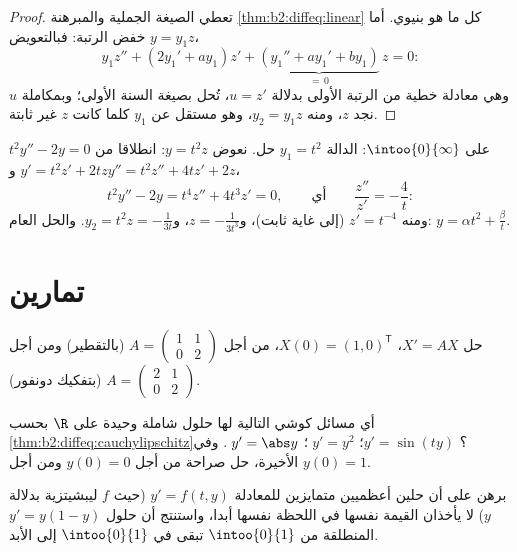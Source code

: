 \begin{proof}
تعطي الصيغة الجملية والمبرهنة \cref{thm:b2:diffeq:linear} كل ما هو بنيوي. أما خفض الرتبة:
فبالتعويض $y = y_1z$،
\[
y_1 z'' + (2y_1' + a y_1)z' + \underbrace{(y_1'' + ay_1' +
by_1)}_{=\,0}\,z = 0 :
\]
وهي معادلة خطية من الرتبة الأولى بدلالة $u = z'$، تُحل بصيغة السنة
الأولى؛ وبمكاملة $u$ نجد $z$، ومنه $y_2 = y_1 z$، وهو مستقل عن $y_1$
كلما كانت $z$ غير ثابتة.
\end{proof}

\begin{example}\label{ex:b2:diffeq:lowering}
$t^2y'' - 2y = 0$ على $\intoo{0}{\infty}$: الدالة $y_1 = t^2$ حل. نعوض $y = t^2z$: انطلاقا من $y' = t^2z' + 2tz$
و$y''
= t^2z'' + 4tz' + 2z$،
\[
t^2y'' - 2y = t^4 z'' + 4t^3z' = 0,
\qquad\text{أي}\qquad \frac{z''}{z'} = -\frac4t :
\]
ومنه $z' = t^{-4}$ (إلى غاية ثابت)، و$z = -\frac{1}{3t^3}$، و$y_2
= t^2z = -\frac{1}{3t}$. والحل العام: $y = \alpha t^2 +
\frac{\beta}{t}$.
\end{example}

\section{تمارين}

\begin{exercise}[$\star$]\label{exo:b2:diffeq:1}
حل $X' = AX$، $X(0) = (1, 0)^{\mathsf T}$، من أجل $A =
\begin{pmatrix} 1 & 1\\ 0 & 2\end{pmatrix}$ (بالتقطير) ومن أجل $A =
\begin{pmatrix} 2 & 1\\ 0 & 2 \end{pmatrix}$
(بتفكيك دونفور).
\end{exercise}

\begin{exercise}[$\star$]\label{exo:b2:diffeq:2}
أي مسائل كوشي التالية لها حلول شاملة وحيدة على $\R$ بحسب \cref{thm:b2:diffeq:cauchylipschitz}؟
$y' = \sin(ty)$؛ $\;y' =
y^2$؛ $\;y' = \abs y$. وفي الأخيرة، حل صراحة من أجل $y(0) =
0$ ومن
أجل $y(0) = 1$.
\end{exercise}

\begin{exercise}[$\star$]\label{exo:b2:diffeq:3}
برهن على أن حلين أعظميين متمايزين للمعادلة $y' = f(t,y)$ (حيث $f$
ليبشيتزية بدلالة $y$) لا يأخذان القيمة نفسها في اللحظة نفسها
أبدا، واستنتج أن حلول $y' = y(1 - y)$ المنطلقة من $\intoo{0}{1}$ تبقى في $\intoo{0}{1}$ إلى
الأبد.
\end{exercise}


